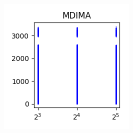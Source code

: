 \documentclass[sigconf,authorversion]{acmart}
\begin{document}
\begin{figure}[htb]
\begin{subfigure}[b]{0.3\textwidth}
        \label{fig:ndimc}
    \end{subfigure}
    \begin{subfigure}[b]{0.3\textwidth}
        \includegraphics[width=\textwidth]{img/MDIMA.png}
        \label{fig:mdima}
    \end{subfigure}
\end{figure}
\end{document}
